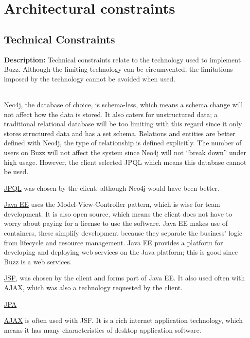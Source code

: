 \documentclass{article}
\begin{document}
\section{Architectural constraints}
\subsection{Technical Constraints}
\textbf{Description:}
Technical constraints relate to the technology used to implement Buzz. Although the limiting technology can be circumvented, the limitations imposed by the technology cannot be avoided when used. \\ \\ \par
\underline{Neo4j}, the database of choice, is schema-less, which means a schema change will not affect how the data is stored. It also caters for unstructured data; a traditional relational database will be too limiting with this regard since it only stores structured data and has a set schema. Relations and entities are better defined with Neo4j, the type of relationship is defined explicitly. The number of users on Buzz will not affect the system since Neo4j will not “break down” under high usage. However, the client selected JPQL which means this database cannot be used. \\ \par
\underline{JPQL} was chosen by the client, although Neo4j would have been better. \\ \par
\underline{Java EE} uses the Model-View-Controller pattern, which is wise for team development. It is also open source, which means the client does not have to worry about paying for a license to use the software. Java EE makes use of containers, these simplify development because they separate the business’  logic from lifecycle and resource management. Java EE provides a platform for developing and deploying web services on the Java platform; this is good since Buzz is a web services. \\ \par
\underline{JSF}, was chosen by the client and forms part of Java EE. It also used often with AJAX, which was also a technology requested by the client. \\ \par
\underline{JPA} \\ \par
\underline{AJAX} is often used with JSF. It is a rich internet application technology, which means it has many characteristics of desktop application software. \\ \par
\end{document}
